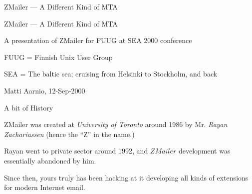 \documentclass[a4paper,landscape]{slides}
\newcommand{\ZM}{ZMailer}
\begin{document}
\pagestyle{plain}


\begin{slide}

\begin{center}
 ZMailer --- A Different Kind of MTA
\end{center}

\vfill

\begin{center}
\end{center}

\vfill

\end{slide}


\begin{overlay}

\begin{center}
 ZMailer --- A Different Kind of MTA
\end{center}

\vfill

  A presentation of ZMailer for  FUUG at SEA 2000 conference

     FUUG = Finnish Unix User Group

     SEA  = The baltic sea; cruising from Helsinki to Stockholm, and back

 Matti Aarnio, 12-Sep-2000


\end{overlay}



\begin{slide}
\centerline{\large A bit of History}

\vfill
\ZM{} was created at {\it University of Toronto} around 1986 by
Mr. {\it Rayan Zachariassen} (hence the ``Z'' in the name.)

Rayan went to private sector around 1992, and $ZMailer$ development
was essentially abandoned by him.

Since then, yours truly has been hacking at it developing all kinds
of extensions for modern Internet email.

\vfill

\end{slide}

\end{document}
